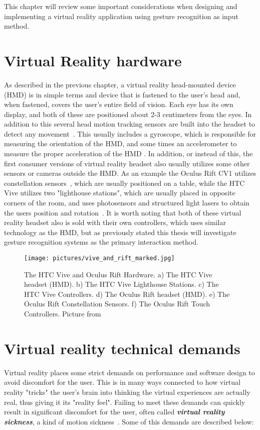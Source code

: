 This chapter will review some important considerations when designing and implementing a virtual reality application using gesture recognition as input method.

\section{Virtual Reality hardware}
As described in the previous chapter, a virtual reality head-mounted device (HMD) is in simple terms and device that is fastened to the user's head and, when fastened, covers the
user's entire field of vision. Each eye has its own display, and both of these are positioned about 2-3 centimeters from the eyes. In addition to this several head motion
tracking sensors are built into the headset to detect any movement~\citep{POLYGON2016}. This usually includes a gyroscope, which is responsible for measuring the orientation of the
HMD, and some times an accelerometer to measure the proper acceleration of the HMD \citep{THEVERGE2016}. In addition, or instead of this, the first consumer versions of 
virtual reality headset also usually utilizes some other sensors or cameras outside the HMD. As an example the Oculus Rift CV1 utilizes constellation sensors~\cite{VRFOCUS2015}, 
which are usually positioned on a table, while the HTC Vive utilizes two "lighthouse stations", which are usually placed in opposite corners of the room, and uses photosensors and 
structured light lasers to obtain the users position and rotation~\cite{GIZMODO2015}. 
It is worth noting that both of these virtual reality headset also is sold with their own controllers, which uses similar technology as the HMD, but as previously stated this
thesis will investigate gesture recognition systems as the primary interaction method.  

\begin{figure}%
	\texttt{[image: pictures/vive\_and\_rift\_marked.jpg]}
	\caption[The HTC Vive and Oculus Rift Hardware]{The HTC Vive and Oculus Rift Hardware. 
    a) The HTC Vive headset (HMD). b) The HTC Vive Lighthouse Stations. c) The HTC Vive Controllers. d) The Oculus Rift headset (HMD). e) The Oculus Rift Constellation Sensors. 
    f) The Oculus Rift Touch Controllers. Picture from \citet{ROADTOVR2016}}
	\label{fig:vive_and_rift_marked}
\end{figure} 

\section{Virtual reality technical demands}
Virtual reality places some strict demands on performance and software design to avoid discomfort for the user. This is in many ways connected to how virtual reality "tricks" 
the user's brain into thinking the virtual experiences are actually real, thus giving it its "reality feel". Failing to meet these demands can quickly result in significant 
discomfort for the user, often called \textbf{\textit{virtual reality sickness}}, a kind of motion sickness~\citep{ARSTECHNICA2013}. Some of this demands are described below:

